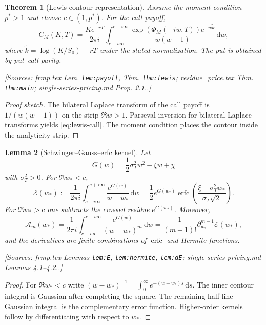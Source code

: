 \documentclass[11pt]{article}
\newtheorem{theorem}{Theorem}[section]
\newtheorem{lemma}[theorem]{Lemma}
\theoremstyle{definition}
\newcommand{\dd}{\,\mathrm{d}}
\newcommand{\erfc}{\operatorname{erfc}}
\newcommand{\Source}[1]{\par\smallskip\noindent\textup{[Sources: #1.]}}
\begin{document}
\begin{theorem}[Lewis contour representation]\label{thm:lewis}
Assume the moment condition $p^*>1$ and choose $c\in(1,p^*)$.
For the call payoff,
\begin{equation}\label{eq:lewis-call}
        C_M(K,T)=\frac{Ke^{-rT}}{2\pi i}
        \int_{c-i\infty}^{c+i\infty}
        \frac{\exp(\Phi_M(-iw,T))e^{-w\tilde k}}{w(w-1)}\dd w,
\end{equation}
where $\tilde k=\log(K/S_0)-rT$ under the stated normalization.
The put is obtained by put--call parity.
\Source{frmp.tex Lem. \texttt{lem:payoff}, Thm. \texttt{thm:lewis}; residue\_price.tex Thm. \texttt{thm:main}; single-series-pricing.md Prop. 2.1.}
\end{theorem}

\begin{proof}[Proof sketch]
The bilateral Laplace transform of the call payoff is $1/(w(w-1))$ on the strip $\Re w>1$.
Parseval inversion for bilateral Laplace transforms yields \eqref{eq:lewis-call}.
The moment condition places the contour inside the analyticity strip.
\end{proof}

\begin{lemma}[Schwinger--Gauss--erfc kernel]\label{lem:erfc-kernel}
Let
\begin{equation}\label{eq:g-gaussian}
        G(w)=\frac12\sigma_T^2w^2-\xi w+\chi
\end{equation}
with $\sigma_T^2>0$.
For $\Re w_*<c$,
\begin{equation}\label{eq:erfc-kernel}
        \mathcal{E}(w_*)
        :=\frac1{2\pi i}\int_{c-i\infty}^{c+i\infty}
        \frac{e^{G(w)}}{w-w_*}\dd w
        =\frac12e^{G(w_*)}\erfc\left(\frac{\xi-\sigma_T^2w_*}{\sigma_T\sqrt2}\right).
\end{equation}
For $\Re w_*>c$ one subtracts the crossed residue $e^{G(w_*)}$.
Moreover,
\begin{equation}\label{eq:hermite-atoms}
        \mathcal{A}_m(w_*)=\frac1{2\pi i}\int_{c-i\infty}^{c+i\infty}
        \frac{e^{G(w)}}{(w-w_*)^m}\dd w
        =\frac1{(m-1)!}\partial_{w_*}^{m-1}\mathcal{E}(w_*),
\end{equation}
and the derivatives are finite combinations of $\erfc$ and Hermite functions.
\Source{frmp.tex Lemmas \texttt{lem:E}, \texttt{lem:hermite}, \texttt{lem:dE}; single-series-pricing.md Lemmas 4.1--4.2.}
\end{lemma}

\begin{proof}
For $\Re w_*<c$ write
$(w-w_*)^{-1}=\int_0^{\infty}e^{-(w-w_*)s}\dd s$.
The inner contour integral is Gaussian after completing the square.
The remaining half-line Gaussian integral is the complementary error function.
Higher-order kernels follow by differentiating with respect to $w_*$.
\end{proof}
\end{document}
